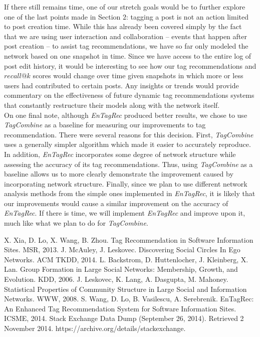 \documentclass[10pt, final]{article}
\newcommand{\br}[1][.75]{\ \\[#1\baselineskip]}
\begin{document}
If there still remains time, one of our stretch goals would be to further explore one of the last points made in Section $2$: tagging a post is not an action limited to post creation time. While this has already been covered simply by the fact that we are using user interaction and collaboration -- events that happen after post creation -- to assist tag recommendations, we have so far only modeled the network based on one snapshot in time. Since we have access to the entire log of post edit history, it would be interesting to see how our tag recommendations and $recall@k$ scores would change over time given snapshots in which more or less users had contributed to certain posts. Any insights or trends would provide commentary on the effectiveness of future dynamic tag recommendations systems that constantly restructure their models along with the network itself.\br
On one final note, although \textit{EnTagRec} produced better results, we chose to use \textit{TagCombine} as a baseline for measuring our improvements to tag recommendation. There were several reasons for this decision. First, \textit{TagCombine} uses a generally simpler algorithm which made it easier to accurately reproduce. In addition, \textit{EnTagRec} incorporates some degree of network structure while assessing the accuracy of its tag recommendations. Thus, using \textit{TagCombine} as a baseline allows us to more clearly demonstrate the improvement caused by incorporating network structure. Finally, since we plan to use different network analysis methods from the simple ones implemented in \textit{EnTagRec}, it is likely that our improvements would cause a similar improvement on the accuracy of \textit{EnTagRec}. If there is time, we will implement \textit{EnTagRec} and improve upon it, much like what we plan to do for \textit{TagCombine}.



\begin{thebibliography}{1}
 X. Xia, D. Lo, X. Wang, B. Zhou. Tag Recommendation in Software Information Sites. MSR, 2013.
 J. McAuley, J. Leskovec. Discovering Social Circles In Ego Networks. ACM TKDD, 2014.
 L. Backstrom, D. Huttenlocher, J. Kleinberg, X. Lan. Group Formation in Large Social Networks: Membership, Growth, and Evolution. KDD, 2006.
 J. Leskovec, K. Lang, A. Dasgupta, M. Mahoney. Statistical Properties of Community Structure in Large Social and Information Networks. WWW, 2008.
 S. Wang, D. Lo, B. Vasilescu, A. Serebrenik. EnTagRec: An Enhanced Tag Recommendation System for Software Information Sites. ICSME, 2014.
 Stack Exchange Data Dump (September 26, 2014). Retrieved 2 November 2014. https://archive.org/details/stackexchange.
\end{thebibliography}
\end{document}
